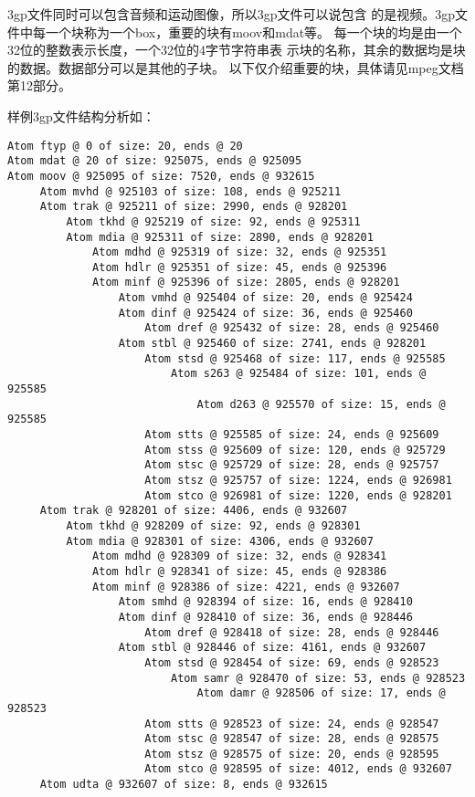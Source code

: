 \documentclass[11pt]{article}
\begin{document}
    3gp文件同时可以包含音频和运动图像，所以3gp文件可以说包含
的是视频。3gp文件中每一个块称为一个box，重要的块有moov和mdat等。
每一个块的均是由一个32位的整数表示长度，一个32位的4字节字符串表
示块的名称，其余的数据均是块的数据。数据部分可以是其他的子块。
以下仅介绍重要的块，具体请见mpeg文档第12部分。

    样例3gp文件结构分析如：

{  \small
\begin{verbatim}
Atom ftyp @ 0 of size: 20, ends @ 20
Atom mdat @ 20 of size: 925075, ends @ 925095
Atom moov @ 925095 of size: 7520, ends @ 932615
     Atom mvhd @ 925103 of size: 108, ends @ 925211
     Atom trak @ 925211 of size: 2990, ends @ 928201
         Atom tkhd @ 925219 of size: 92, ends @ 925311
         Atom mdia @ 925311 of size: 2890, ends @ 928201
             Atom mdhd @ 925319 of size: 32, ends @ 925351
             Atom hdlr @ 925351 of size: 45, ends @ 925396
             Atom minf @ 925396 of size: 2805, ends @ 928201
                 Atom vmhd @ 925404 of size: 20, ends @ 925424
                 Atom dinf @ 925424 of size: 36, ends @ 925460
                     Atom dref @ 925432 of size: 28, ends @ 925460
                 Atom stbl @ 925460 of size: 2741, ends @ 928201
                     Atom stsd @ 925468 of size: 117, ends @ 925585
                         Atom s263 @ 925484 of size: 101, ends @ 925585
                             Atom d263 @ 925570 of size: 15, ends @ 925585
                     Atom stts @ 925585 of size: 24, ends @ 925609
                     Atom stss @ 925609 of size: 120, ends @ 925729
                     Atom stsc @ 925729 of size: 28, ends @ 925757
                     Atom stsz @ 925757 of size: 1224, ends @ 926981
                     Atom stco @ 926981 of size: 1220, ends @ 928201
     Atom trak @ 928201 of size: 4406, ends @ 932607
         Atom tkhd @ 928209 of size: 92, ends @ 928301
         Atom mdia @ 928301 of size: 4306, ends @ 932607
             Atom mdhd @ 928309 of size: 32, ends @ 928341
             Atom hdlr @ 928341 of size: 45, ends @ 928386
             Atom minf @ 928386 of size: 4221, ends @ 932607
                 Atom smhd @ 928394 of size: 16, ends @ 928410
                 Atom dinf @ 928410 of size: 36, ends @ 928446
                     Atom dref @ 928418 of size: 28, ends @ 928446
                 Atom stbl @ 928446 of size: 4161, ends @ 932607
                     Atom stsd @ 928454 of size: 69, ends @ 928523
                         Atom samr @ 928470 of size: 53, ends @ 928523
                             Atom damr @ 928506 of size: 17, ends @ 928523
                     Atom stts @ 928523 of size: 24, ends @ 928547
                     Atom stsc @ 928547 of size: 28, ends @ 928575
                     Atom stsz @ 928575 of size: 20, ends @ 928595
                     Atom stco @ 928595 of size: 4012, ends @ 932607
     Atom udta @ 932607 of size: 8, ends @ 932615
\end{verbatim}
}
    
\end{document}
